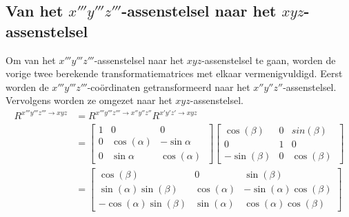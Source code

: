 \subsection{Van het $x'''y'''z'''$-assenstelsel naar het $xyz$-assenstelsel}
Om van het $x'''y'''z'''$-assenstelsel naar het $xyz$-assenstelsel te gaan, worden de vorige twee berekende transformatiematrices met elkaar vermenigvuldigd. Eerst worden de $x'''y'''z'''$-co\"ordinaten getransformeerd naar het $x''y''z''$-assenstelsel. Vervolgens worden ze omgezet naar het $xyz$-assenstelsel.
\begin{equation*}
\begin{split}
R^{x'''y'''z''' \rightarrow xyz} & =R^{x'''y'''z''' \rightarrow x''y''z''}R^{x'y'z' \rightarrow xyz} \\
&=
  \begin{bmatrix}
      1 & 0 & 0\\
      0 & \cos(\alpha) & -\sin{\alpha}\\ 
      0 & \sin{\alpha} & \cos(\alpha)\
      \end{bmatrix}
  \begin{bmatrix}
      \cos(\beta) & 0 & sin(\beta)\\
      0 & 1 & 0\\ 
      -\sin(\beta) & 0 & \cos(\beta)\
      \end{bmatrix} \\
&=
  \begin{bmatrix}
      \cos(\beta) & 0 & \sin(\beta)\\
      \sin(\alpha)\sin(\beta) & \cos(\alpha) & -\sin(\alpha)\cos(\beta)\\
      -\cos(\alpha)\sin(\beta) & \sin(\alpha) & \cos(\alpha)\cos(\beta)\  
      \end{bmatrix}
\end{split}
\end{equation*}